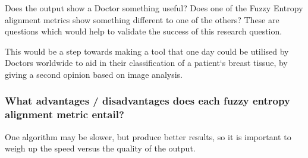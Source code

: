 Does the output show a Doctor something useful? Does one of the Fuzzy Entropy alignment metrics show something different to one of the others? These are questions which would help to validate the success of this research question.

This would be a step towards making a tool that one day could be utilised by Doctors worldwide to aid in their classification of a patient`s breast tissue, by giving a second opinion based on image analysis.

\subsubsection{What advantages / disadvantages does each fuzzy entropy alignment metric entail?}

One algorithm may be slower, but produce better results, so it is important to weigh up the speed versus the quality of the output.
